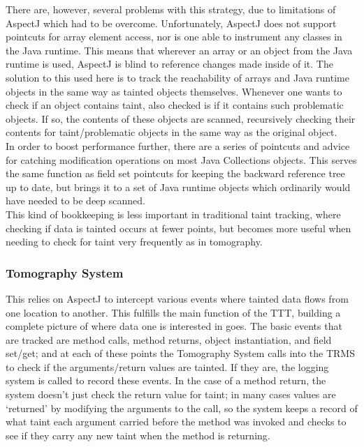 \documentclass[msc,oneside]{ubcthesis}
\begin{document}
There are, however, several problems with this strategy, due to limitations of AspectJ which had to be overcome. Unfortunately, AspectJ does not support pointcuts for array element access, nor is one able to instrument any classes in the Java runtime. This means that wherever an array or an object from the Java runtime is used, AspectJ is blind to reference changes made inside of it. The solution to this used here is to track the reachability of arrays and Java runtime objects in the same way as tainted objects themselves. Whenever one wants to check if an object contains taint, also checked is if it contains such problematic objects. If so, the contents of these objects are scanned, recursively checking their contents for taint/problematic objects in the same way as the original object.\\

In order to boost performance further, there are a series of pointcuts and advice for catching modification operations on most Java Collections objects. This serves the same function as field set pointcuts for keeping the backward reference tree up to date, but brings it to a set of Java runtime objects which ordinarily would have needed to be deep scanned.\\

This kind of bookkeeping is less important in traditional taint tracking, where checking if data is tainted occurs at fewer points, but becomes more useful when needing to check for taint very frequently as in tomography.

\subsubsection{Tomography System} 
\label{subsub:trms}
This relies on AspectJ to intercept various events where tainted data flows from one location to another. This fulfills the main function of the TTT, building a complete picture of where data one is interested in goes. The basic events that are tracked are method calls, method returns, object instantiation, and field set/get; and at each of these points the Tomography System calls into the TRMS to check if the arguments/return values are tainted. If they are, the logging system is called to record these events. In the case of a method return, the system doesn't just check the return value for taint; in many cases values are `returned' by modifying the arguments to the call, so the system keeps a record of what taint each argument carried before the method was invoked and checks to see if they carry any new taint when the method is returning. \\
\end{document}
